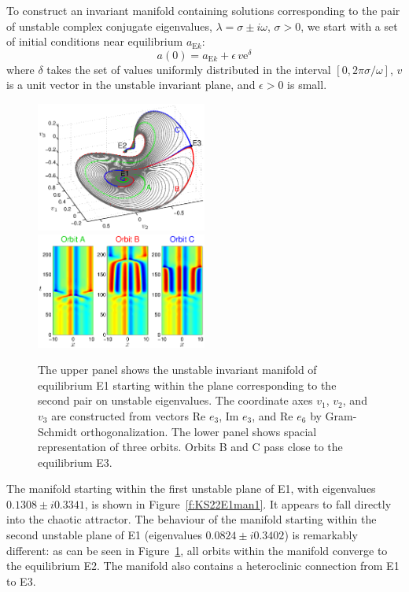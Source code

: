 To construct an invariant manifold containing solutions
corresponding to the pair of unstable complex conjugate eigenvalues,
$\lambda = \sigma\pm i\omega$, $\sigma > 0$, we start with a set of
initial conditions near equilibrium $a_{\mathrm{E}k}$:
\[ a(0) = a_{\mathrm{E}k} + \epsilon\,v\mathrm{e}^{\delta}\]
where $\delta$ takes the set of values uniformly distributed in the
interval $[0,2\pi\sigma/\omega]$, $v$ is a unit vector in the
unstable invariant plane, and $\epsilon > 0$ is small.

\begin{figure}[h]\vspace*{-5pt} \centering
\includegraphics[width=0.5\textwidth]{figs/ks22_E1_plane2_manifold.eps}
\includegraphics[width=0.5\textwidth]{figs/ks22_E1_plane2_orbits.eps}
\vspace*{-5pt}\caption{ {\small The upper panel shows the unstable
invariant manifold of equilibrium E1 starting within the plane
corresponding to the second pair on unstable eigenvalues. The
coordinate axes $v_1$, $v_2$, and $v_3$ are constructed from vectors
Re $e_3$, Im $e_3$, and Re $e_6$ by Gram-Schmidt orthogonalization.
The lower panel shows spacial representation of three orbits. Orbits
B and C pass close to the equilibrium E3.}}
\label{f:KS22E1man2}\vspace*{-5pt}
\end{figure}

The manifold starting within the first unstable plane of E1, with
eigenvalues $0.1308\pm i0.3341$, is shown in
Figure~\ref{f:KS22E1man1}. It appears to fall directly into the
chaotic attractor.  The behaviour of the manifold starting within
the second unstable plane of E1 (eigenvalues $0.0824\pm i0.3402$) is
remarkably different: as can be seen in Figure~\ref{f:KS22E1man2},
all orbits within the manifold converge to the equilibrium E2.  The
manifold also contains a heteroclinic connection from E1 to E3.

